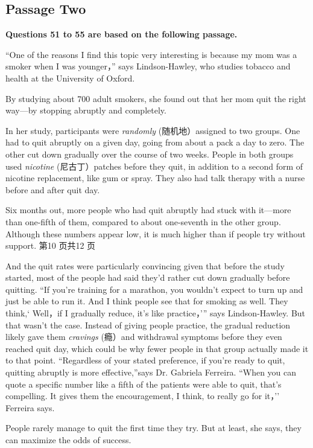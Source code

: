 \documentclass[UTF8,11pt]{ctexart}
\begin{document}
\subsection*{\textbf{Passage Two}}


\textbf{Questions 51 to 55 are based on the following passage.}


“One of the reasons I find this topic very interesting is because my mom was a smoker when I was younger，” says Lindson-Hawley, who studies tobacco and health at the University of Oxford.


By studying about 700 adult smokers, she found out that her mom quit the right way—by stopping abruptly and completely.


In her study, participants were\textit{ randomly} (随机地）assigned to two groups. One had to quit abruptly on a given day, going from about a pack a day to zero. The other cut down gradually over the course of two weeks. People in both groups used\textit{ nicotine} (尼古丁）patches before they quit, in addition to a second form of nicotine replacement, like gum or spray. They also had talk therapy with a nurse before and after quit day.


Six months out, more people who had quit abruptly had stuck with it—more than one-fifth of them, compared to about one-seventh in the other group. Although these numbers appear low, it is much higher than if people try without support. 第10 页共12 页


And the quit rates were particularly convincing given that before the study started, most of the people had said they’d rather cut down gradually before quitting. “If you’re training for a marathon, you wouldn’t expect to turn up and just be able to run it. And I think people see that for smoking as well. They think,‘ Well，if I gradually reduce, it’s like practice，’” says Lindson-Hawley. But that wasn’t the case. Instead of giving people practice, the gradual reduction likely gave them\textit{ cravings} (瘾）and withdrawal symptoms before they even reached quit day, which could be why fewer people in that group actually made it to that point. “Regardless of your stated preference, if you’re ready to quit, quitting abruptly is more effective,”says Dr. Gabriela Ferreira. “When you can quote a specific number like a fifth of the patients were able to quit, that’s compelling. It gives them the encouragement, I think, to really go for it，’’ Ferreira says.


People rarely manage to quit the first time they try. But at least, she says, they can maximize the odds of success.
\end{document}
